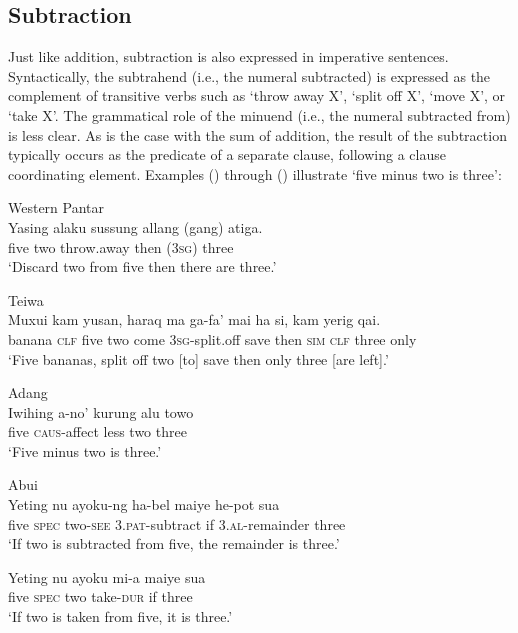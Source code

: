 \subsection{Subtraction}
Just like addition, subtraction is also expressed in imperative sentences. Syntactically, the subtrahend (i.e., the numeral subtracted) is expressed as the complement of transitive verbs such as `throw away X', `split off X', `move X', or `take X'. The grammatical role of the minuend (i.e., the numeral subtracted from) is less clear. As is the case with the sum of addition, the result of the subtraction typically occurs as the predicate of a separate clause, following a clause coordinating element. Examples () through () illustrate `five minus two is three':


\ea%
\label{bkm:Ref358042906}
Western Pantar\\
\gll  Yasing  alaku  sussung  allang  (gang)  atiga.  \\
   five  two  throw.away  then  (\textsc{3sg) } three  \\
\glt `Discard two from five then there are three.'
\z








\ea
Teiwa\\
 \gll Muxui  kam  yusan,     haraq  ma  ga-fa'   mai   ha  si,  kam  yerig   qai.      \\
    banana  \textsc{clf}  five   two  come  \textsc{3sg-}split.off  save  then  \textsc{sim}  \textsc{clf} three  only    \\
 \glt `Five bananas,    split off two [to] save then only three [are left].'
\z

\ea
Adang\\
\gll Iwihing  a-no'   kurung  alu  towo\\
 five  \textsc{caus}{}-affect  less  two  three\\
\glt
\z  `Five minus two is three.'


\ea
Abui \\
 \gll Yeting  nu  ayoku-ng  ha-bel  maiye  he-pot  sua\\
  five  \textsc{spec}   two-\textsc{see } 3.\textsc{pat}{}-subtract  if  \textsc{3.al}{}-remainder  three \\
 \glt `If two is subtracted from five, the remainder is three.'
\z

\ea
 \gll Yeting  nu  ayoku  mi-a  maiye  sua\\
  five  \textsc{spec } two  take-\textsc{dur } if  three   \\
 \glt `If two is taken from five, it is three.'
\z



